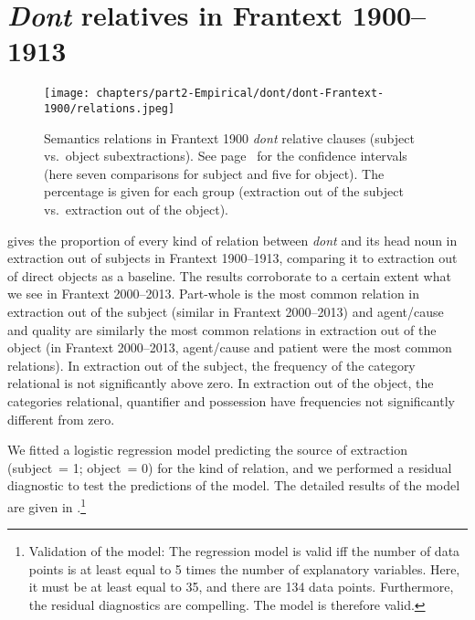 \section{\emph{Dont} relatives in Frantext 1900--1913}

\begin{figure}
        \centering
        \texttt{[image: chapters/part2-Empirical/dont/dont-Frantext-1900/relations.jpeg]}
        \caption[Semantic relations in Frantext 1900 \emph{dont} relative clauses (subject vs.\ object subextractions)]{Semantics relations in Frantext 1900 \emph{dont} relative clauses (subject vs.\ object subextractions). See page~\pageref{ch:conf-intervals-binomial} for the confidence intervals (here seven comparisons for subject and five for object). The percentage is given for each group (extraction out of the subject vs.\ extraction out of the object).}
        \label{fig:dont-d1900-relations}
\end{figure}

 gives the proportion of every kind of relation between \emph{dont} and its head noun in extraction out of subjects in Frantext 1900--1913, comparing it to extraction out of direct objects as a baseline. The results corroborate to a certain extent what we see in Frantext 2000--2013. Part-whole is the most common relation in extraction out of the subject (similar in Frantext 2000--2013) and agent\slash cause and quality are similarly the most common relations in extraction out of the object (in Frantext 2000--2013, agent/cause and patient were the most common relations). In extraction out of the subject, the frequency of the category relational is not significantly above zero. In extraction out of the object, the categories relational, quantifier and possession have frequencies not significantly different from zero.

We fitted a logistic regression model predicting the source of extraction (subject~= 1; object~= 0) for the kind of relation, and we performed a residual diagnostic to test the predictions of the model. The detailed results of the model are given in .\footnote{Validation of the model: The regression model is valid iff the number of data points is at least equal to 5 times the number of explanatory variables. Here, it must be at least equal to 35, and there are 134 data points. Furthermore, the residual diagnostics are compelling. The model is therefore valid.} 

